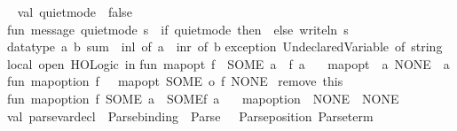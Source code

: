\begin{isabellebody}
\isadelimdocument
%
\endisadelimdocument
%
\isatagdocument
%
\isamarkuptrue%
%
\endisatagdocument
{\isafolddocument}%
%
\isadelimdocument
%
\endisadelimdocument
%
\isadelimML
%
\endisadelimML
%
\isatagML
{}\isamarkupfalse%
{\isacartoucheopen}\ \isanewline
\isanewline
val\ quiet{\isacharunderscore}{\kern0pt}mode\ {\isacharequal}{\kern0pt}\ false\isanewline
\isanewline
fun\ message\ quiet{\isacharunderscore}{\kern0pt}mode\ s\ {\isacharequal}{\kern0pt}\ if\ quiet{\isacharunderscore}{\kern0pt}mode\ then\ {\isacharparenleft}{\kern0pt}{\isacharparenright}{\kern0pt}\ else\ writeln\ s{\isacharsemicolon}{\kern0pt}\isanewline
\isanewline
datatype\ {\isacharparenleft}{\kern0pt}{\isacharprime}{\kern0pt}a{\isacharcomma}{\kern0pt}\ {\isacharprime}{\kern0pt}b{\isacharparenright}{\kern0pt}\ sum\ {\isacharequal}{\kern0pt}\ inl\ of\ {\isacharprime}{\kern0pt}a\ {\isacharbar}{\kern0pt}\ inr\ of\ {\isacharprime}{\kern0pt}b{\isacharsemicolon}{\kern0pt}\isanewline
\isanewline
exception\ Undeclared{\isacharunderscore}{\kern0pt}Variable\ of\ string\isanewline
\isanewline
local\ open\ HOLogic\ in\isanewline
\isanewline
fun\ map{\isacharunderscore}{\kern0pt}opt\ f\ {\isacharunderscore}{\kern0pt}\ {\isacharparenleft}{\kern0pt}SOME\ a{\isacharparenright}{\kern0pt}\ {\isacharequal}{\kern0pt}\ f\ a\isanewline
\ \ \ {\isacharbar}{\kern0pt}map{\isacharunderscore}{\kern0pt}opt\ {\isacharunderscore}{\kern0pt}\ a\ NONE\ {\isacharequal}{\kern0pt}\ a\isanewline
\isanewline
fun\ map{\isacharunderscore}{\kern0pt}option\ f\ \ {\isacharequal}{\kern0pt}\ map{\isacharunderscore}{\kern0pt}opt\ {\isacharparenleft}{\kern0pt}SOME\ o\ f{\isacharparenright}{\kern0pt}\ NONE\isanewline
\isanewline
{\isacharparenleft}{\kern0pt}{\isacharasterisk}{\kern0pt}\ remove\ this\ {\isacharasterisk}{\kern0pt}{\isacharparenright}{\kern0pt}\isanewline
fun\ map{\isacharunderscore}{\kern0pt}option\ f\ {\isacharparenleft}{\kern0pt}SOME\ a{\isacharparenright}{\kern0pt}\ {\isacharequal}{\kern0pt}\ SOME{\isacharparenleft}{\kern0pt}f\ a{\isacharparenright}{\kern0pt}\isanewline
\ \ \ {\isacharbar}{\kern0pt}map{\isacharunderscore}{\kern0pt}option\ {\isacharunderscore}{\kern0pt}\ NONE\ {\isacharequal}{\kern0pt}\ NONE\isanewline
\isanewline
\isanewline
\isanewline
val\ parse{\isacharunderscore}{\kern0pt}var{\isacharunderscore}{\kern0pt}decl\ {\isacharequal}{\kern0pt}\ {\isacharparenleft}{\kern0pt}Parse{\isachardot}{\kern0pt}binding\ {\isacharminus}{\kern0pt}{\isacharminus}{\kern0pt}{\isacharbar}{\kern0pt}\ Parse{\isachardot}{\kern0pt}{\isachardollar}{\kern0pt}{\isachardollar}{\kern0pt}{\isachardollar}{\kern0pt}\ {\isachardoublequote}{\kern0pt}{\isacharcolon}{\kern0pt}{\isachardoublequote}{\kern0pt}\ {\isacharminus}{\kern0pt}{\isacharminus}{\kern0pt}\ {\isacharparenleft}{\kern0pt}Parse{\isachardot}{\kern0pt}position\ {\isacharparenleft}{\kern0pt}Parse{\isachardot}{\kern0pt}term{\isacharparenright}{\kern0pt}{\isacharparenright}{\kern0pt}{\isacharparenright}{\kern0pt}\isanewline

\end{isabellebody}
